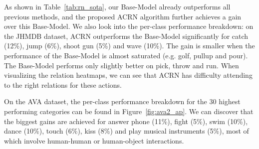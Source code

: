 \documentclass[runningheads]{llncs}
\begin{document}
As shown in Table~\ref{tab:rn_sota}, our Base-Model already outperforms all previous methods, and the proposed ACRN algorithm further achieves a gain over this Base-Model. We also look into the per-class performance breakdown: on the JHMDB dataset, ACRN outperforms the Base-Model significantly for catch (12\%), jump (6\%), shoot gun (5\%) and wave (10\%). The gain is smaller when the performance of the Base-Model is almost saturated (e.g. golf, pullup and pour). The Base-Model performs only slightly better on pick, throw and run. When visualizing the relation heatmaps, we can see that ACRN has difficulty attending to the right relations for these actions.

On the AVA dataset, the per-class performance breakdown for the 30 highest performing categories can be found in Figure~\ref{fig:ava2_ap}. We can discover that the biggest gains are achieved for answer phone (11\%), fight (5\%), swim (10\%), dance (10\%), touch (6\%), kiss (8\%) and play musical instruments (5\%), most of which involve human-human or human-object interactions.

\begin{table}
\begin{center}
\qquad
{}
\end{center}
\caption{Comparison with state of the art on (a) the JHMDB dataset and (b) AVA . For JHMDB, we report average precision over 3 splits.}
\label{tab:rn_sota}
\end{table}
\end{document}
